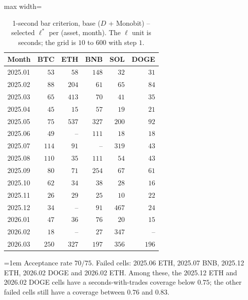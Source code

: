 \documentclass[11pt,titlepage,openany,oneside]{book}  %
\newcommand{\floatnote}[1]{%
  \par\smallskip\noindent%
  \begin{minipage}{\linewidth}%
    \footnotesize\emergencystretch=1em #1%
  \end{minipage}\par%
}
\begin{document}
\begin{table}[!htbp]
  \caption[1-second bar base criterion -- selected $\ell^*$]{1-second bar criterion, base ($D$ + Monobit) -- selected $\ell^*$ per (asset, month). The $\ell$ unit is seconds; the grid is $10$ to $600$ with step $1$.}
  \label{tab:appendix-a6}
  \begin{center}
    \begin{adjustbox}{max width=\textwidth}
    \begin{tabular}{lrrrrr}
      \toprule
      Month   & BTC   & ETH   & BNB   & SOL   & DOGE  \\
      \midrule
      2025.01 & $53$  & $58$  & $148$ & $32$  & $31$  \\
      2025.02 & $88$  & $204$ & $61$  & $65$  & $84$  \\
      2025.03 & $65$  & $413$ & $70$  & $41$  & $35$  \\
      2025.04 & $45$  & $15$  & $57$  & $19$  & $21$  \\
      2025.05 & $75$  & $537$ & $327$ & $200$ & $92$  \\
      2025.06 & $49$  & --    & $111$ & $18$  & $18$  \\
      2025.07 & $114$ & $91$  & --    & $319$ & $43$  \\
      2025.08 & $110$ & $35$  & $111$ & $54$  & $43$  \\
      2025.09 & $80$  & $71$  & $254$ & $67$  & $61$  \\
      2025.10 & $62$  & $34$  & $38$  & $28$  & $16$  \\
      2025.11 & $26$  & $29$  & $25$  & $10$  & $22$  \\
      2025.12 & $34$  & --    & $91$  & $467$ & $24$  \\
      2026.01 & $47$  & $36$  & $76$  & $20$  & $15$  \\
      2026.02 & $18$  & --    & $27$  & $347$ & --    \\
      2026.03 & $250$ & $327$ & $197$ & $356$ & $196$ \\
      \bottomrule
    \end{tabular}
    \end{adjustbox}
  \end{center}
  \floatnote{Acceptance rate $70/75$. Failed cells: 2025.06 ETH, 2025.07 BNB, 2025.12 ETH, 2026.02 DOGE and 2026.02 ETH. Among these, the 2025.12 ETH and 2026.02 DOGE cells have a seconds-with-trades coverage below $0.75$; the other failed cells still have a coverage between $0.76$ and $0.83$.}
\end{table}
\end{document}
